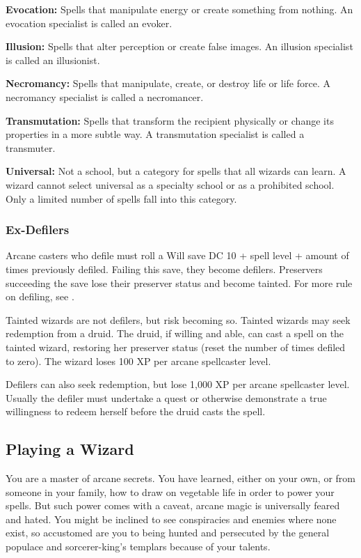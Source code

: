 \textbf{Evocation:} Spells that manipulate energy or create something from nothing. An evocation specialist is called an evoker.

\textbf{Illusion:} Spells that alter perception or create false images. An illusion specialist is called an illusionist.

\textbf{Necromancy:} Spells that manipulate, create, or destroy life or life force. A necromancy specialist is called a necromancer.

\textbf{Transmutation:} Spells that transform the recipient physically or change its properties in a more subtle way. A transmutation specialist is called a transmuter.

\textbf{Universal:} Not a school, but a category for spells that all wizards can learn. A wizard cannot select universal as a specialty school or as a prohibited school. Only a limited number of spells fall into this category.

\subsubsection{Ex-Defilers}
Arcane casters who defile must roll a Will save DC 10 + spell level + amount of times previously defiled. Failing this save, they become defilers. Preservers succeeding the save lose their preserver status and become tainted. For more rule on defiling, see .

Tainted wizards are not defilers, but risk becoming so. Tainted wizards may seek redemption from a druid. The druid, if willing and able, can cast a  spell on the tainted wizard, restoring her preserver status (reset the number of times defiled to zero). The wizard loses 100 XP per arcane spellcaster level.

Defilers can also seek redemption, but lose 1,000 XP per arcane spellcaster level. Usually the defiler must undertake a quest or otherwise demonstrate a true willingness to redeem herself before the druid casts the  spell.

\subsection{Playing a Wizard}
You are a master of arcane secrets. You have learned, either on your own, or from someone in your family, how to draw on vegetable life in order to power your spells. But such power comes with a caveat, arcane magic is universally feared and hated. You might be inclined to see conspiracies and enemies where none exist, so accustomed are you to being hunted and persecuted by the general populace and sorcerer-king's templars because of your talents.

